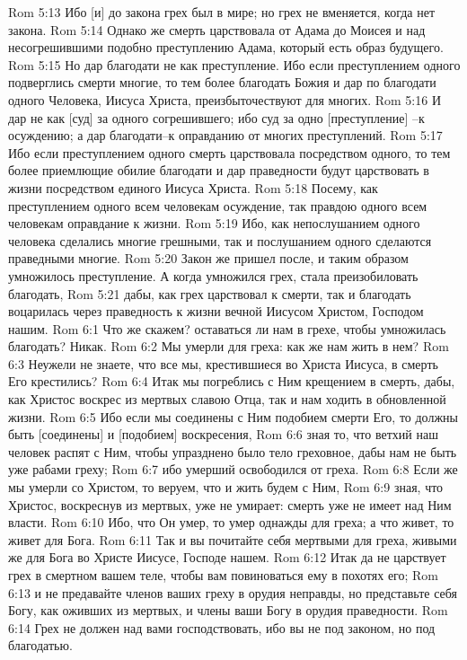 Rom 5:13  Ибо [и] до закона грех был в мире; но грех не вменяется, когда нет закона.
Rom 5:14  Однако же смерть царствовала от Адама до Моисея и над несогрешившими подобно преступлению Адама, который есть образ будущего.
Rom 5:15  Но дар благодати не как преступление. Ибо если преступлением одного подверглись смерти многие, то тем более благодать Божия и дар по благодати одного Человека, Иисуса Христа, преизбыточествуют для многих.
Rom 5:16  И дар не как [суд] за одного согрешившего; ибо суд за одно [преступление] --к осуждению; а дар благодати--к оправданию от многих преступлений.
Rom 5:17  Ибо если преступлением одного смерть царствовала посредством одного, то тем более приемлющие обилие благодати и дар праведности будут царствовать в жизни посредством единого Иисуса Христа.
Rom 5:18  Посему, как преступлением одного всем человекам осуждение, так правдою одного всем человекам оправдание к жизни.
Rom 5:19  Ибо, как непослушанием одного человека сделались многие грешными, так и послушанием одного сделаются праведными многие.
Rom 5:20  Закон же пришел после, и таким образом умножилось преступление. А когда умножился грех, стала преизобиловать благодать,
Rom 5:21  дабы, как грех царствовал к смерти, так и благодать воцарилась через праведность к жизни вечной Иисусом Христом, Господом нашим.
Rom 6:1  Что же скажем? оставаться ли нам в грехе, чтобы умножилась благодать? Никак.
Rom 6:2  Мы умерли для греха: как же нам жить в нем?
Rom 6:3  Неужели не знаете, что все мы, крестившиеся во Христа Иисуса, в смерть Его крестились?
Rom 6:4  Итак мы погреблись с Ним крещением в смерть, дабы, как Христос воскрес из мертвых славою Отца, так и нам ходить в обновленной жизни.
Rom 6:5  Ибо если мы соединены с Ним подобием смерти Его, то должны быть [соединены] и [подобием] воскресения,
Rom 6:6  зная то, что ветхий наш человек распят с Ним, чтобы упразднено было тело греховное, дабы нам не быть уже рабами греху;
Rom 6:7  ибо умерший освободился от греха.
Rom 6:8  Если же мы умерли со Христом, то веруем, что и жить будем с Ним,
Rom 6:9  зная, что Христос, воскреснув из мертвых, уже не умирает: смерть уже не имеет над Ним власти.
Rom 6:10  Ибо, что Он умер, то умер однажды для греха; а что живет, то живет для Бога.
Rom 6:11  Так и вы почитайте себя мертвыми для греха, живыми же для Бога во Христе Иисусе, Господе нашем.
Rom 6:12  Итак да не царствует грех в смертном вашем теле, чтобы вам повиноваться ему в похотях его;
Rom 6:13  и не предавайте членов ваших греху в орудия неправды, но представьте себя Богу, как оживших из мертвых, и члены ваши Богу в орудия праведности.
Rom 6:14  Грех не должен над вами господствовать, ибо вы не под законом, но под благодатью.
